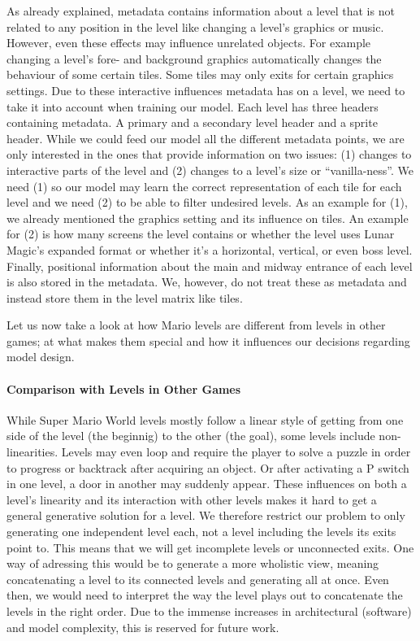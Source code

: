As already explained, metadata contains information about a level that
is not related to any position in the level like changing a level's
graphics or music. However, even these effects may influence unrelated
objects. For example changing a level's fore- and background graphics
automatically changes the behaviour of some certain tiles. Some tiles
may only exits for certain graphics settings. Due to these interactive
influences metadata has on a level, we need to take it into account
when training our model. Each level has three headers containing
metadata. A primary and a secondary level header and a sprite header.
While we could feed our model all the different metadata points, we
are only interested in the ones that provide information on two
issues: (1) changes to interactive parts of the level and (2) changes
to a level's size or ``vanilla-ness''. We need (1) so our model may
learn the correct representation of each tile for each level and we
need (2) to be able to filter undesired levels. As an example for (1),
we already mentioned the graphics setting and its influence on tiles.
An example for (2) is how many screens the level contains or whether
the level uses Lunar Magic's expanded format or whether it's a
horizontal, vertical, or even boss level. \\
Finally, positional information about the main and midway entrance of
each level is also stored in the metadata. We, however, do not treat
these as metadata and instead store them in the level matrix like
tiles.

Let us now take a look at how Mario levels are different from levels
in other games; at what makes them special and how it influences our
decisions regarding model design.

\paragraph{Comparison with Levels in Other Games}

While Super Mario World levels mostly follow a linear style of getting
from one side of the level (the beginnig) to the other (the goal),
some levels include non-linearities. Levels may even loop and require
the player to solve a puzzle in order to progress or backtrack after
acquiring an object. Or after activating a P switch in one level, a
door in another may suddenly appear. These influences on both a
level's linearity and its interaction with other levels makes it hard
to get a general generative solution for a level. We therefore
restrict our problem to only generating one independent level each,
not a level including the levels its exits point to. This means that
we will get incomplete levels or unconnected exits. One way of
adressing this would be to generate a more wholistic view, meaning
concatenating a level to its connected levels and generating all at
once. Even then, we would need to interpret the way the level plays
out to concatenate the levels in the right order. Due to the immense
increases in architectural (software) and model complexity, this is
reserved for future work.

